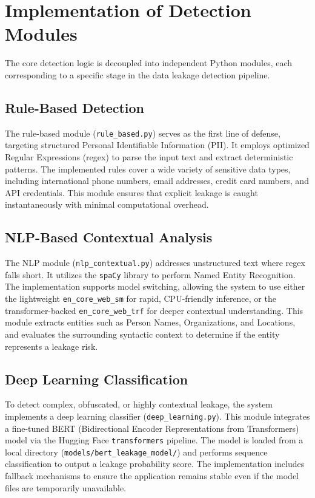 \section{Implementation of Detection Modules}
\par The core detection logic is decoupled into independent Python modules, each corresponding to a specific stage in the data leakage detection pipeline.

\subsection{Rule-Based Detection}
\par The rule-based module (\texttt{rule\_based.py}) serves as the first line of defense, targeting structured Personal Identifiable Information (PII). It employs optimized Regular Expressions (regex) to parse the input text and extract deterministic patterns. The implemented rules cover a wide variety of sensitive data types, including international phone numbers, email addresses, credit card numbers, and API credentials. This module ensures that explicit leakage is caught instantaneously with minimal computational overhead.

\subsection{NLP-Based Contextual Analysis}
\par The NLP module (\texttt{nlp\_contextual.py}) addresses unstructured text where regex falls short. It utilizes the \texttt{spaCy} library to perform Named Entity Recognition. The implementation supports model switching, allowing the system to use either the lightweight \texttt{en\_core\_web\_sm} for rapid, CPU-friendly inference, or the transformer-backed \texttt{en\_core\_web\_trf} for deeper contextual understanding. This module extracts entities such as Person Names, Organizations, and Locations, and evaluates the surrounding syntactic context to determine if the entity represents a leakage risk.

\subsection{Deep Learning Classification}
\par To detect complex, obfuscated, or highly contextual leakage, the system implements a deep learning classifier (\texttt{deep\_learning.py}). This module integrates a fine-tuned BERT (Bidirectional Encoder Representations from Transformers) model via the Hugging Face \texttt{transformers} pipeline. The model is loaded from a local directory (\texttt{models/bert\_leakage\_model/}) and performs sequence classification to output a leakage probability score. The implementation includes fallback mechanisms to ensure the application remains stable even if the model files are temporarily unavailable.

